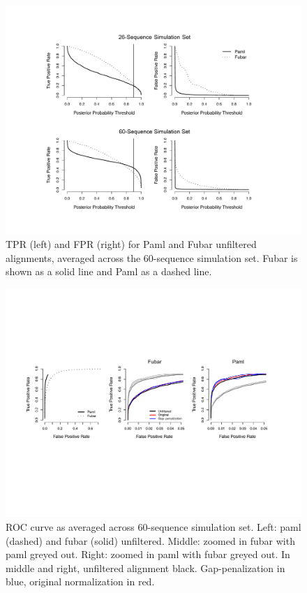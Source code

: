 \documentclass[10pt]{article}
\begin{document}
\begin{figure}
\label{tprfpr}
\centerline{\includegraphics[width=5in]{Figures/tprfpr.pdf}}
\caption{TPR (left) and FPR (right) for Paml and Fubar unfiltered alignments, averaged across the 60-sequence simulation set. Fubar is shown as a solid line and Paml as a dashed line.}
\end{figure}

\begin{figure}
\centerline{\includegraphics[width=7in]{Figures/roc.pdf}}
\caption{\label{roc} ROC curve as averaged across 60-sequence simulation set. Left: paml (dashed) and fubar (solid) unfiltered. Middle: zoomed in fubar with paml greyed out. Right: zoomed in paml with fubar greyed out. In middle and right, unfiltered alignment black. Gap-penalization in blue, original normalization in red.}
\end{figure}
\end{document}
